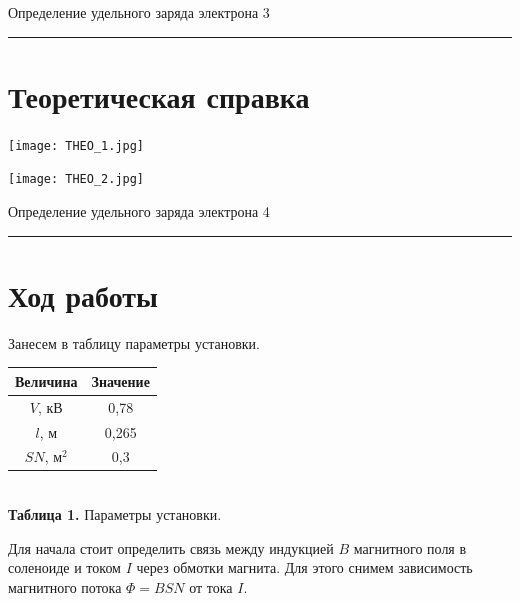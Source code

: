 \documentclass[12pt,a4paper]{scrartcl}
\begin{document}
\newpage
	
	\begin{flushleft}
		\footnotesize{Определение удельного заряда электрона} \hspace{\fill} \footnotesize{3}
		\\[-0.3cm]\noindent\rule{\textwidth}{0.3pt}
	\end{flushleft}

\section{Теоретическая справка}

	\begin{center}
		\texttt{[image: THEO\_1.jpg]}
	\end{center}
	
	\begin{center}
		\texttt{[image: THEO\_2.jpg]}
	\end{center}
	
	\newpage
	
	\begin{flushleft}
		\footnotesize{Определение удельного заряда электрона} \hspace{\fill} \footnotesize{4}
		\\[-0.3cm]\noindent\rule{\textwidth}{0.3pt}
	\end{flushleft}
	
	\section{Ход работы}
	
	Занесем в таблицу параметры установки.
\begin{center}
\begin{tabular}{|c|c|}
\hline
Величина & Значение  \\ \hline
$V$, кВ & 0,78  \\ \hline
$l$, м & 0,265  \\ \hline
$SN$, м$^2$ & 0,3  \\ \hline
\end{tabular}\\
\textbf{Таблица 1.} Параметры установки.
\end{center}
Для начала стоит определить связь между индукцией $B$ магнитного поля в соленоиде и током $I$ через обмотки магнита. Для этого снимем зависимость магнитного потока $\Phi = BSN$ от тока $I$.
\end{document}
